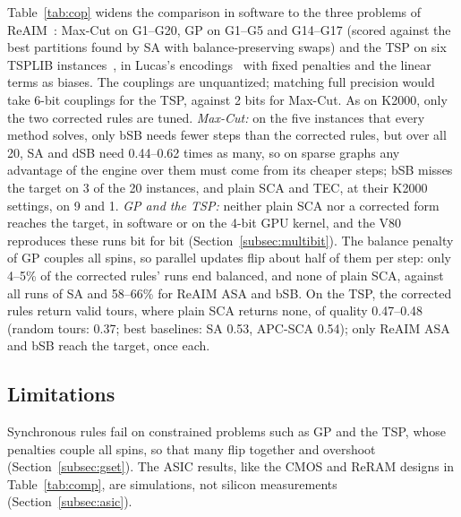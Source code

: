 Table~\ref{tab:cop} widens the comparison in software to the three problems of ReAIM~\cite{10609617}: Max-Cut on G1--G20, GP on G1--G5 and G14--G17 (scored against the best partitions found by SA with balance-preserving swaps) and the TSP on six TSPLIB instances~\cite{reinelt1991tsplib}, in Lucas's encodings~\cite{lucas2014ising} with fixed penalties and the linear terms as biases. The couplings are unquantized; matching full precision would take 6-bit couplings for the TSP, against 2 bits for Max-Cut. As on K2000, only the two corrected rules are tuned. \emph{Max-Cut:} on the five instances that every method solves, only bSB needs fewer steps than the corrected rules, but over all 20, SA and dSB need 0.44--0.62 times as many, so on sparse graphs any advantage of the engine over them must come from its cheaper steps; bSB misses the target on 3 of the 20 instances, and plain SCA and TEC, at their K2000 settings, on 9 and 1. \emph{GP and the TSP:} neither plain SCA nor a corrected form reaches the target, in software or on the 4-bit GPU kernel, and the V80 reproduces these runs bit for bit (Section~\ref{subsec:multibit}). The balance penalty of GP couples all spins, so parallel updates flip about half of them per step: only 4--5\% of the corrected rules' runs end balanced, and none of plain SCA, against all runs of SA and 58--66\% for ReAIM ASA and bSB. On the TSP, the corrected rules return valid tours, where plain SCA returns none, of quality 0.47--0.48 (random tours: 0.37; best baselines: SA 0.53, APC-SCA 0.54); only ReAIM ASA and bSB reach the target, once each.

\subsection{Limitations}\label{subsec:limits}
Synchronous rules fail on constrained problems such as GP and the TSP, whose penalties couple all spins, so that many flip together and overshoot (Section~\ref{subsec:gset}). The ASIC results, like the CMOS and ReRAM designs in Table~\ref{tab:comp}, are simulations, not silicon measurements (Section~\ref{subsec:asic}).
